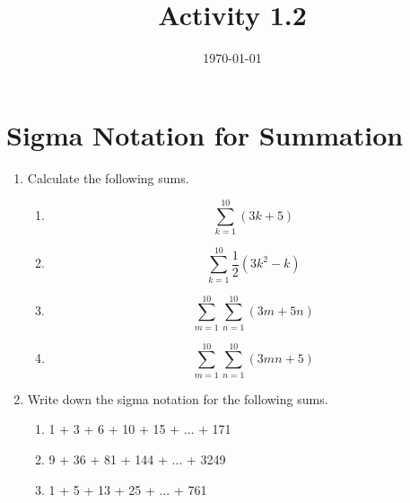 \documentclass[12pt]{amsart}
\title{Activity 1.2}
\date{\today}
\begin{document}
\maketitle
\part*{Sigma Notation for Summation}
\begin{enumerate}
\item Calculate the following sums.%
  \begin{enumerate}
    \item \begin{equation*}
      \sum_{k = 1}^{10} (3k + 5)
    \end{equation*}
    \item \begin{equation*}
      \sum_{k = 1}^{10} \frac{1}{2}(3k^2 - k)
    \end{equation*}
    \item \begin{equation*}
      \sum_{m = 1}^{10}\sum_{n = 1}^{10} (3m + 5n)
    \end{equation*}
    \item \begin{equation*}
      \sum_{m = 1}^{10}\sum_{n = 1}^{10} (3mn + 5)
    \end{equation*}
    
  \end{enumerate}
\item Write down the sigma notation for the following sums.%
  \begin{enumerate}
    \item 1 + 3 + 6 + 10 + 15 + $\ldots$ + 171%
    \item 9 + 36 + 81 + 144 + $\ldots$ + 3249%
    \item 1 + 5 + 13 + 25 + $\ldots$ + 761%
  \end{enumerate}
\end{enumerate}
\end{document}
